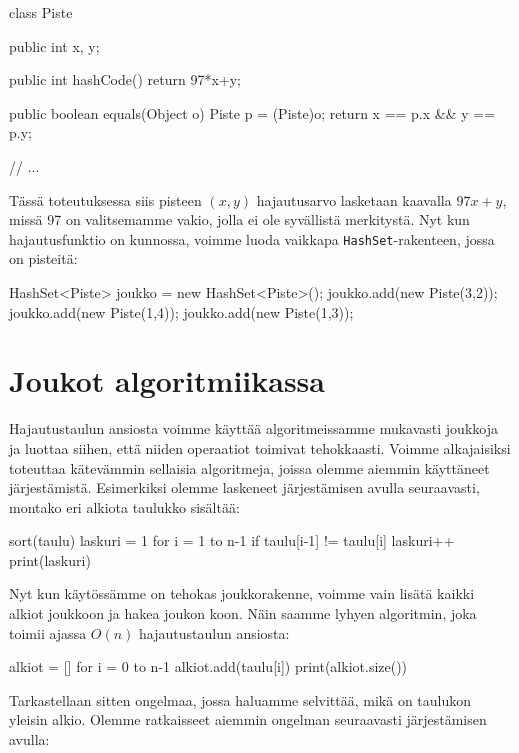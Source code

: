 \begin{code}
class Piste {
    public int x, y;

    public int hashCode() {
        return 97*x+y;
    }
    
    public boolean equals(Object o) {
        Piste p = (Piste)o;
        return x == p.x && y == p.y;
    }

    // ...
}
\end{code}

Tässä toteutuksessa siis pisteen $(x,y)$ hajautusarvo lasketaan
kaavalla $97x+y$, missä 97 on valitsemamme vakio, jolla ei ole
syvällistä merkitystä.
Nyt kun hajautusfunktio on kunnossa,
voimme luoda vaikkapa \texttt{HashSet}-rakenteen, jossa on pisteitä:

\begin{code}
HashSet<Piste> joukko = new HashSet<Piste>();
joukko.add(new Piste(3,2));
joukko.add(new Piste(1,4));
joukko.add(new Piste(1,3));
\end{code}

\newpage

\section{Joukot algoritmiikassa}

Hajautustaulun ansiosta voimme käyttää algoritmeissamme
mukavasti joukkoja ja luottaa siihen, että niiden operaatiot toimivat tehokkaasti.
Voimme alkajaisiksi toteuttaa kätevämmin sellaisia algoritmeja,
joissa olemme aiemmin käyttäneet järjestämistä.
Esimerkiksi olemme laskeneet järjestämisen avulla seuraavasti,
montako eri alkiota taulukko sisältää:

\begin{code}
sort(taulu)
laskuri = 1
for i = 1 to n-1
    if taulu[i-1] != taulu[i]
        laskuri++
print(laskuri)
\end{code}

Nyt kun käytössämme on tehokas joukkorakenne, voimme vain lisätä
kaikki alkiot joukkoon ja hakea joukon koon.
Näin saamme lyhyen algoritmin, joka toimii ajassa $O(n)$
hajautustaulun ansiosta:

\begin{code}
alkiot = []
for i = 0 to n-1
    alkiot.add(taulu[i])
print(alkiot.size())
\end{code}

Tarkastellaan sitten ongelmaa, jossa haluamme selvittää,
mikä on taulukon yleisin alkio.
Olemme ratkaisseet aiemmin ongelman seuraavasti
järjestä\-misen avulla:

